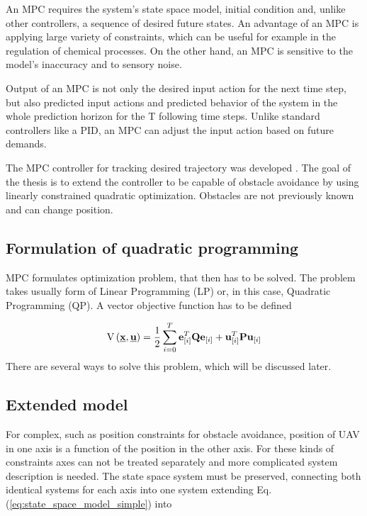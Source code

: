 \documentclass[a4paper,11pt,titlepage]{article}
\newcommand{\uvec}{\textbf{\underline{u}}}
\begin{document}
An MPC requires the system's state space model, initial condition and, unlike other controllers, a sequence of desired future states. An advantage of an MPC is applying large variety of constraints, which can be useful for example in the regulation of chemical processes. On the other hand, an MPC is sensitive to the model's inaccuracy and to sensory noise. 

Output of an MPC is not only the desired input action for the next time step, but also predicted input actions and predicted behavior of the system in the whole prediction horizon for the T following time steps. Unlike standard controllers like a PID, an MPC can adjust the input action based on future demands.

The MPC controller for tracking desired trajectory was developed \cite{tomas}. The goal of the thesis is to extend the controller to be capable of obstacle avoidance by using linearly constrained quadratic optimization. Obstacles are not previously known and can change position.

\subsection{Formulation of quadratic programming}
MPC formulates optimization problem, that then has to be solved. The problem takes usually form of Linear Programming (LP) or, in this case, Quadratic Programming (QP). A vector objective function has to be defined

\begin{equation}
\label{eq:QP_formulation}
\begin{split}
\mathrm{V}\left(\textbf{\underline{x}}, \uvec\right) = \frac{1}{2}\sum_{i=0}^{T}\textbf{e}^T_{[i]}\textbf{Q}\textbf{e}_{[i]} + \textbf{u}^T_{[i]}\textbf{P}\textbf{u}_{[i]}
\end{split}
\end{equation}
There are several ways to solve this problem, which will be discussed later.

\subsection{Extended model}		%
For complex, such as position constraints for obstacle avoidance, position of UAV in one axis is a function of the position in the other axis. For these kinds of constraints axes can not be treated separately and more complicated system description is needed. The state space system must be preserved, connecting both identical systems for each axis into one system extending Eq. (\ref{eq:state_space_model_simple}) into 
\end{document}
